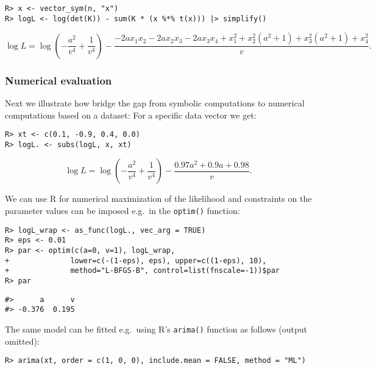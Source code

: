 \begin{verbatim}
R> x <- vector_sym(n, "x")
R> logL <- log(det(K)) - sum(K * (x %*% t(x))) |> simplify()
\end{verbatim}

\begin{equation}
\log L = \log{\left(- \frac{a^{2}}{v^{4}} + \frac{1}{v^{4}} \right)} - \frac{- 2 a x_{1} x_{2} - 2 a x_{2} x_{3} - 2 a x_{3} x_{4} + x_{1}^{2} + x_{2}^{2} \left(a^{2} + 1\right) + x_{3}^{2} \left(a^{2} + 1\right) + x_{4}^{2}}{v} .
\end{equation}

\hypertarget{numerical-evaluation}{%
\subsubsection{Numerical evaluation}\label{numerical-evaluation}}

Next we illustrate how bridge the gap from symbolic computations to numerical computations based on a dataset:
For a specific data vector we get:

\begin{verbatim}
R> xt <- c(0.1, -0.9, 0.4, 0.0)
R> logL. <- subs(logL, x, xt) 
\end{verbatim}

\begin{equation}
\log L = \log{\left(- \frac{a^{2}}{v^{4}} + \frac{1}{v^{4}} \right)} - \frac{0.97 a^{2} + 0.9 a + 0.98}{v} .
\end{equation}

We can use R for numerical maximization of the likelihood and constraints on the
parameter values can be imposed e.g.~in the \texttt{optim()} function:

\begin{verbatim}
R> logL_wrap <- as_func(logL., vec_arg = TRUE)
R> eps <- 0.01
R> par <- optim(c(a=0, v=1), logL_wrap, 
+              lower=c(-(1-eps), eps), upper=c((1-eps), 10),
+              method="L-BFGS-B", control=list(fnscale=-1))$par
R> par
\end{verbatim}

\begin{verbatim}
#>      a      v 
#> -0.376  0.195
\end{verbatim}

The same model can be fitted e.g.~using R's \texttt{arima()} function as follows (output omitted):

\begin{verbatim}
R> arima(xt, order = c(1, 0, 0), include.mean = FALSE, method = "ML")
\end{verbatim}

